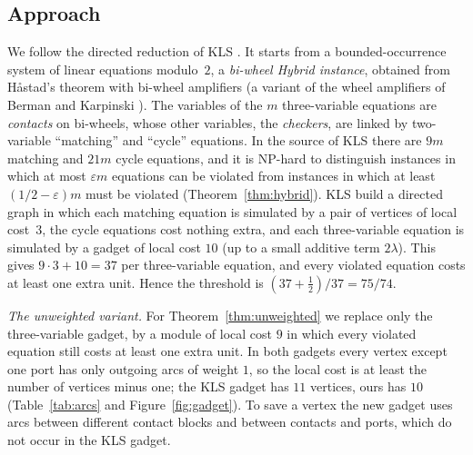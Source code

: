 \documentclass[11pt]{amsart}
\theoremstyle{definition}
\theoremstyle{remark}
\numberwithin{equation}{section}
\newcommand{\eps}{\varepsilon}
\begin{document}
\subsection*{Approach}
We follow the directed reduction of KLS \cite[\S6]{KLS15}. It starts from a bounded-occurrence system of linear equations modulo~$2$, a \emph{bi-wheel Hybrid instance}, obtained from H\aa{}stad's theorem \cite{Has01} with bi-wheel amplifiers (a variant of the wheel amplifiers of Berman and Karpinski \cite{BK99,BK01}). The variables of the $m$ three-variable equations are \emph{contacts} on bi-wheels, whose other variables, the \emph{checkers}, are linked by two-variable ``matching'' and ``cycle'' equations. In the source of KLS there are $9m$ matching and $21m$ cycle equations, and it is NP-hard to distinguish instances in which at most $\eps m$ equations can be violated from instances in which at least $(1/2-\eps)m$ must be violated (Theorem~\ref{thm:hybrid}). KLS build a directed graph in which each matching equation is simulated by a pair of vertices of local cost~$3$, the cycle equations cost nothing extra, and each three-variable equation is simulated by a gadget of local cost $10$ (up to a small additive term $2\lambda$). This gives $9\cdot3+10=37$ per three-variable equation, and every violated equation costs at least one extra unit. Hence the threshold is $(37+\tfrac12)/37=75/74$.

\emph{The unweighted variant.} For Theorem~\ref{thm:unweighted} we replace only the three-variable gadget, by a module of local cost $9$ in which every violated equation still costs at least one extra unit. In both gadgets every vertex except one port has only outgoing arcs of weight $1$, so the local cost is at least the number of vertices minus one; the KLS gadget has $11$ vertices, ours has $10$ (Table~\ref{tab:arcs} and Figure~\ref{fig:gadget}). To save a vertex the new gadget uses arcs between different contact blocks and between contacts and ports, which do not occur in the KLS gadget.
\end{document}
